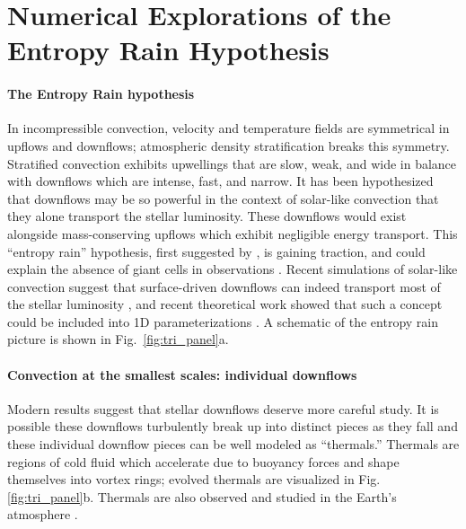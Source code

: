 \documentclass[11pt, preprint, hmargin=1in, vmargin=1in]{aastex62}
\begin{document}
\vspace{-55pt}
\section{Numerical Explorations of the Entropy Rain Hypothesis}
\paragraph{The Entropy Rain hypothesis}
In incompressible convection, velocity and temperature fields are symmetrical in upflows and downflows; atmospheric density stratification breaks this symmetry.
Stratified convection exhibits upwellings that are slow, weak, and wide in balance with downflows which are intense, fast, and narrow.
It has been hypothesized that downflows may be so powerful in the context of solar-like convection that they alone transport the stellar luminosity.
These downflows would exist alongside mass-conserving upflows which exhibit negligible energy transport.
This ``entropy rain'' hypothesis, first suggested by \citet{spruit1997}, is gaining traction, and could explain the absence of giant cells in observations \citep{hanasoge&all2015}.
Recent simulations of solar-like convection suggest that surface-driven downflows can indeed transport most of the stellar luminosity \citep{kapyla&all2017}, and recent theoretical work showed that such a concept could be included into 1D parameterizations \citep{brandenburg2016}.
A schematic of the entropy rain picture is shown in Fig.~\ref{fig:tri_panel}a.


\paragraph{Convection at the smallest scales: individual downflows} 
Modern results suggest that stellar downflows deserve more careful study.
It is possible these downflows turbulently break up into distinct pieces as they fall and these individual downflow pieces can be well modeled as ``thermals.''
Thermals are regions of cold fluid which accelerate due to buoyancy forces and shape themselves into vortex rings; evolved thermals are visualized in Fig. \ref{fig:tri_panel}b.
Thermals are also observed and studied in the Earth's atmosphere \citep{lecoanet&jeevanjee2019}.
\end{document}
